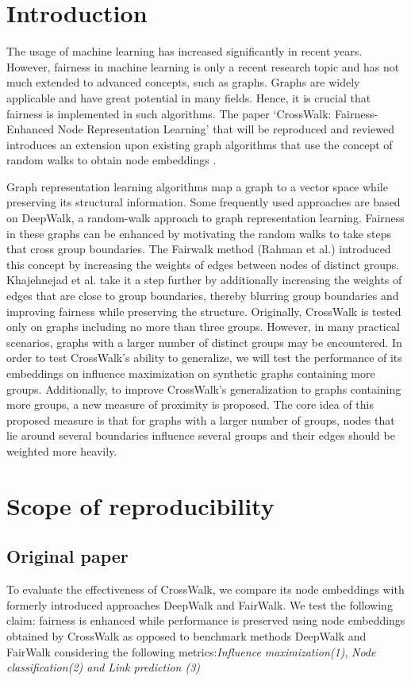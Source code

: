 \section{Introduction}
The usage of machine learning has increased significantly in recent years. However, fairness in machine learning is only a recent research topic and has not much extended to advanced concepts, such as graphs. Graphs are widely applicable and have great potential in many fields. Hence, it is crucial that fairness is implemented in such algorithms. The paper ‘CrossWalk: Fairness-Enhanced Node Representation Learning’ that will be reproduced and reviewed introduces an extension upon existing graph algorithms that use the concept of random walks to obtain node embeddings \cite{khajehnejad2022crosswalk}. 

Graph representation learning algorithms map a graph to a vector space while preserving its structural information. Some frequently used approaches are based on DeepWalk, a random-walk approach to graph representation learning. Fairness in these graphs can be enhanced by motivating the random walks to take steps that cross group boundaries. The Fairwalk method (Rahman et al.) \cite{rahman2019fairwalk} introduced this concept by increasing the weights of edges between nodes of distinct groups. Khajehnejad et al. take it a step further by additionally increasing the weights of edges that are close to group boundaries, thereby blurring group boundaries and improving fairness while preserving the structure. Originally, CrossWalk is tested only on graphs including no more than three groups. However, in many practical scenarios, graphs with a larger number of distinct groups may be encountered. In order to test CrossWalk's ability to generalize, we will test the performance of its embeddings on influence maximization on synthetic graphs containing more groups. Additionally, to improve CrossWalk's generalization to graphs containing more groups, a new measure of proximity is proposed. The core idea of this proposed measure is that for graphs with a larger number of groups, nodes that lie around several boundaries influence several groups and their edges should be weighted more heavily.

\section{Scope of reproducibility}

\subsection{Original paper}
To evaluate the effectiveness of CrossWalk, we compare its node embeddings with formerly introduced approaches DeepWalk and FairWalk.  We test the following claim: fairness is enhanced while performance is preserved using node embeddings obtained by CrossWalk as opposed to benchmark methods DeepWalk and FairWalk considering the following metrics:\textit{Influence maximization\label{claim1}(1)},
\textit{Node classification\label{claim2}(2) and }\textit{Link prediction \label{claim3}(3)}
